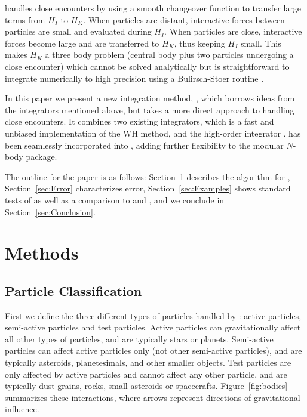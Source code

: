 \mercury handles close encounters by using a smooth changeover function to transfer large terms from $H_I$ to $H_K$. 
When particles are distant, interactive forces between particles are small and evaluated during $H_I$. 
When particles are close, interactive forces become large and are transferred to $H_K$, thus keeping $H_I$ small. 
This makes $H_K$ a three body problem (central body plus two particles undergoing a close encounter) which cannot be solved analytically but is straightforward to integrate numerically to high precision using a Bulirsch-Stoer routine \citep{BS1988}. 
 
In this paper we present a new integration method, \hermes, which borrows ideas from the integrators mentioned above, but takes a more direct approach to handling close encounters.
It combines two existing integrators, \whfast \citep{Rein2015b} 
 which is a fast and unbiased implementation of the WH method, and the high-order \ias integrator \citep{Rein2015a}. 
\hermes has been seamlessly incorporated into \reb \citep{Rein2012}, adding further flexibility to the modular $N$-body package. 

The outline for the paper is as follows: Section~\ref{sec:Methods} describes the algorithm for \hermes, Section~\ref{sec:Error} characterizes error, Section~\ref{sec:Examples} shows standard tests of \hermes as well as a comparison to \symba and \mercury, and we conclude in Section~\ref{sec:Conclusion}.

\section{Methods}
\label{sec:Methods}

\subsection{Particle Classification}
First we define the three different types of particles handled by \hermes: active particles, semi-active particles and test particles. 
Active particles can gravitationally affect all other types of particles, and are typically stars or planets.
Semi-active particles can affect active particles only (not other semi-active particles), and are typically asteroids, planetesimals, and other smaller objects.
Test particles are only affected by active particles and cannot affect any other particle, and are typically dust grains, rocks, small asteroids or spacecrafts. 
Figure~\ref{fig:bodies} summarizes these interactions, where arrows represent directions of gravitational influence.

